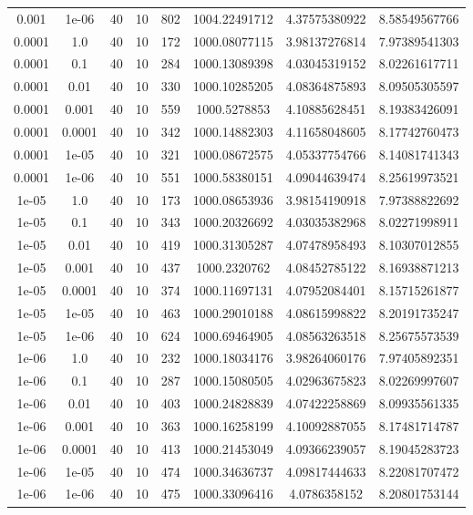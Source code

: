 \documentclass[11pt,a4paper]{article}
\begin{document}
\begin{table}
{\begin{tabular}{*{8}c}
 0.001 & 1e-06 &40 &10 & 802& 1004.22491712 & 4.37575380922 & 8.58549567766 \\ 
 0.0001 & 1.0 &40 &10 & 172& 1000.08077115 & 3.98137276814 & 7.97389541303 \\ 
 0.0001 & 0.1 &40 &10 & 284& 1000.13089398 & 4.03045319152 & 8.02261617711 \\ 
 0.0001 & 0.01 &40 &10 & 330& 1000.10285205 & 4.08364875893 & 8.09505305597 \\ 
 0.0001 & 0.001 &40 &10 & 559& 1000.5278853 & 4.10885628451 & 8.19383426091 \\ 
 0.0001 & 0.0001 &40 &10 & 342& 1000.14882303 & 4.11658048605 & 8.17742760473 \\ 
 0.0001 & 1e-05 &40 &10 & 321& 1000.08672575 & 4.05337754766 & 8.14081741343 \\ 
 0.0001 & 1e-06 &40 &10 & 551& 1000.58380151 & 4.09044639474 & 8.25619973521 \\ 
 1e-05 & 1.0 &40 &10 & 173& 1000.08653936 & 3.98154190918 & 7.97388822692 \\ 
 1e-05 & 0.1 &40 &10 & 343& 1000.20326692 & 4.03035382968 & 8.02271998911 \\ 
 1e-05 & 0.01 &40 &10 & 419& 1000.31305287 & 4.07478958493 & 8.10307012855 \\ 
 1e-05 & 0.001 &40 &10 & 437& 1000.2320762 & 4.08452785122 & 8.16938871213 \\ 
 1e-05 & 0.0001 &40 &10 & 374& 1000.11697131 & 4.07952084401 & 8.15715261877 \\ 
 1e-05 & 1e-05 &40 &10 & 463& 1000.29010188 & 4.08615998822 & 8.20191735247 \\ 
 1e-05 & 1e-06 &40 &10 & 624& 1000.69464905 & 4.08563263518 & 8.25675573539 \\ 
 1e-06 & 1.0 &40 &10 & 232& 1000.18034176 & 3.98264060176 & 7.97405892351 \\ 
 1e-06 & 0.1 &40 &10 & 287& 1000.15080505 & 4.02963675823 & 8.02269997607 \\ 
 1e-06 & 0.01 &40 &10 & 403& 1000.24828839 & 4.07422258869 & 8.09935561335 \\ 
 1e-06 & 0.001 &40 &10 & 363& 1000.16258199 & 4.10092887055 & 8.17481714787 \\ 
 1e-06 & 0.0001 &40 &10 & 413& 1000.21453049 & 4.09366239057 & 8.19045283723 \\ 
 1e-06 & 1e-05 &40 &10 & 474& 1000.34636737 & 4.09817444633 & 8.22081707472 \\ 
 1e-06 & 1e-06 &40 &10 & 475& 1000.33096416 & 4.0786358152 & 8.20801753144 \\ 
\end{tabular}}
\label{Tab::1}
\end{table} 
\end{document}
